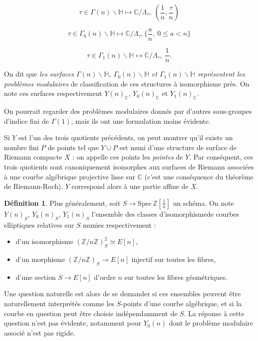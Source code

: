 \documentclass[11pt,a4paper]{article}
\newcommand{\Z}{\mathbb{Z}}
\newcommand{\C}{\mathbb{C}}
\renewcommand{\H}{\mathbb{H}}
\renewcommand{\b}{\backslash}
\newcommand{\vers}{\rightarrow}
\newcommand{\Spec}{\mathrm{Spec}\,}
\theoremstyle{definition}
\newtheorem*{defi}{Définition}
\begin{document}
$$\tau\in \Gamma(n)\b \H \longmapsto \C/\Lambda_\tau,\ (\frac{1}{n},\frac{\tau}{n})$$

$$\tau\in \Gamma_0(n)\b \H \longmapsto \C/\Lambda_\tau, \{\frac{a}{n},\ 0\leq a<n\}$$

$$\tau\in \Gamma_1(n)\b \H \longmapsto \C/\Lambda_\tau,\ \frac{1}{n}.$$

On dit que \emph{les surfaces $\Gamma(n)\b \H$, $\Gamma_0(n)\b \H$ et $\Gamma_1(n)\b \H$ représentent les problèmes modulaires} de classification de ces structures à isomorphisme près. On note ces surfaces respectivement $Y(n)_\C$, $Y_0(n)_\C$ et $Y_1(n)_\C$.

On pourrait regarder des problèmes modulaires donnés par d'autres sous-groupes d'indice fini de $\Gamma(1)$, mais ils ont une formulation moins évidente.

Si $Y$ est l'un des trois quotients précédents, on peut montrer qu'il existe un nombre fini $P$ de points tel que $Y\cup P$ est muni d'une structure de surface de Riemann compacte $X$ : on appelle ces points les \emph{pointes} de $Y$. Par conséquent, ces trois quotients sont canoniquement isomorphes aux surfaces de Riemann associées à une courbe algébrique projective lisse sur $\C$ (c'est une conséquence du théorème de Riemann-Roch). $Y$ correspond alors à une partie affine de $X$.

\begin{defi}

Plus généralement, soit $S \vers \Spec\Z\left[\frac{1}{n}\right]$ un schéma. On note $Y(n)_S$, $Y_0(n)_S$, $Y_1(n)_S$ l'ensemble des \og classes d'isomorphisme\fg de courbes elliptiques relatives sur $S$ munies respectivement :

\begin{itemize}

\item d'un isomorphisme $(\Z/n\Z)^2_S\simeq E[n]$,
\item d'un morphisme $(\Z/n\Z)_S \vers E[n]$ injectif sur toutes les fibres,
\item d'une section $S\vers E[n]$ d'ordre $n$ sur toutes les fibres géométriques.

\end{itemize}

\end{defi}

Une question naturelle est alors de se demander si ces ensembles peuvent être naturellement interprétés comme les $S$-points d'une courbe algébrique, et si la courbe en question peut être choisie indépendamment de $S$. La réponse à cette question n'est pas évidente, notamment pour $Y_0(n)$ dont le problème modulaire associé n'est pas rigide.
\end{document}
